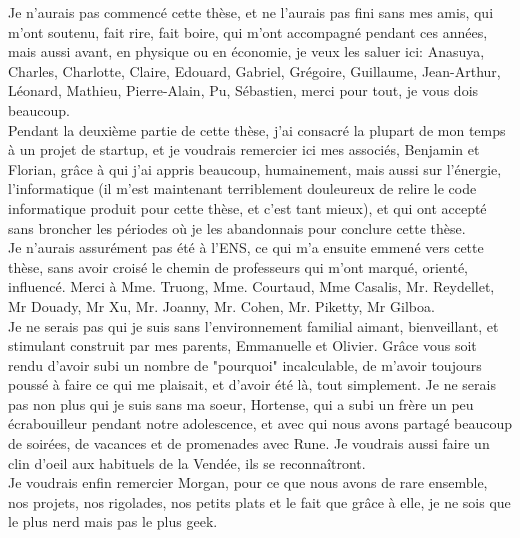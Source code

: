 Je n'aurais pas commencé cette thèse, et ne l'aurais pas fini sans mes amis, qui m'ont soutenu, fait rire, fait boire, qui m'ont accompagné pendant ces années, mais aussi avant, en physique ou en économie, je veux les saluer ici: Anasuya, Charles, Charlotte, Claire, Edouard, Gabriel, Grégoire, Guillaume, Jean-Arthur, Léonard, Mathieu, Pierre-Alain, Pu, Sébastien, merci pour tout, je vous dois beaucoup. \\

Pendant la deuxième partie de cette thèse, j'ai consacré la plupart de mon temps à un projet de startup, et je voudrais remercier ici mes associés, Benjamin et Florian, grâce à qui j'ai appris beaucoup, humainement, mais aussi sur l'énergie, l'informatique (il m'est maintenant terriblement douleureux de relire le code informatique produit pour cette thèse, et c'est tant mieux), et qui ont accepté sans broncher les périodes où je les abandonnais pour conclure cette thèse.\\

Je n'aurais assurément pas été à l'ENS, ce qui m'a ensuite emmené vers cette thèse, sans avoir croisé le chemin de professeurs qui m'ont marqué, orienté, influencé. Merci à Mme. Truong, Mme. Courtaud, Mme Casalis, Mr. Reydellet, Mr Douady, Mr Xu, Mr. Joanny, Mr. Cohen, Mr. Piketty, Mr Gilboa.\\

Je ne serais pas qui je suis sans l'environnement familial aimant, bienveillant, et stimulant construit par mes parents, Emmanuelle et Olivier. Grâce vous soit rendu d'avoir subi un nombre de "pourquoi" incalculable, de m'avoir toujours poussé à faire ce qui me plaisait, et d'avoir été là, tout simplement. Je ne serais pas non plus qui je suis sans ma soeur, Hortense, qui a subi un frère un peu écrabouilleur pendant notre adolescence, et avec qui nous avons partagé beaucoup de soirées, de vacances et de promenades avec Rune. Je voudrais aussi faire un clin d'oeil aux habituels de la Vendée, ils se reconnaîtront.\\

Je voudrais enfin remercier Morgan, pour ce que nous avons de rare ensemble, nos projets, nos rigolades, nos petits plats et le fait que grâce à elle, je ne sois que le plus nerd mais pas le plus geek. \\

